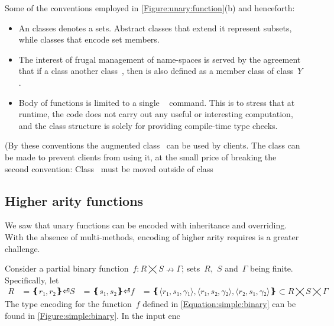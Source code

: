 Some of the conventions employed in \cref{Figure:unary:function}(b) and henceforth:
\begin{itemize}
  \item An  classes denotes a sets. Abstract classes that extend it represent
      subsets, while  classes that encode set members.
  \item The interest of frugal management of name-spaces is served by the agreement that if
    a class   another class~, then is also defined
    as a  member class of class~$Y$.
  \item Body of functions is limited to a single  ~\cc{;} command.
    This is to stress that at runtime, the code does not carry out any useful or interesting computation,
      and the class structure is solely for providing compile-time type checks.
\end{itemize}
(By these conventions the augmented class~ can be used by clients.
The class can be made  to prevent clients from using it,
  at the small price of breaking the second convention:
  Class~ must be moved outside of class~

\subsection{Higher arity functions}
We saw that unary functions can be encoded with inheritance and overriding. 
With the absence of multi-methods, encoding of higher arity requires is a greater challenge. 

Consider a partial binary function~$f: R⨉S↛Γ$; sets~$R$,~$S$ and~$Γ$ being finite. 
Specifically, let
\begin{equation}
  \label{Equation:simple:binary}
\begin{split}
  R & = ❴ r₁, r₂❵⏎
  S & = ❴ s₁, s₂❵⏎
  f & = ❴ ⟨r₁, s₁,γ₁⟩, ⟨r₁, s₂,γ₂⟩, ⟨r₂, s₁,γ₂⟩ ❵ ⊂R⨉S⨉Γ
\end{split}
\end{equation}
The \Java type encoding for the function~$f$ defined in \cref{Equation:simple:binary}
  can be found in \cref{Figure:simple:binary}.
In the input enc

